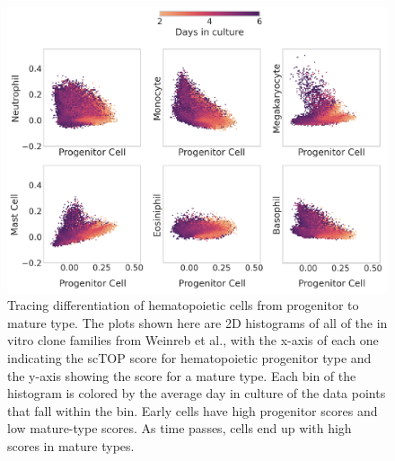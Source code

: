 \documentclass[aps,superscriptaddress, notitlepage,longbibliography]{revtex4-1}
\begin{document}
\begin{figure}
	\centering
		\includegraphics[scale=0.75]{figs/hem progenitor hists.png}
	\caption{Tracing differentiation of hematopoietic cells from progenitor to mature type. The plots shown here are 2D histograms of all of the in vitro clone families from Weinreb et al., with the x-axis of each one indicating the scTOP score for hematopoietic progenitor type and the y-axis showing the score for a mature type. Each bin of the histogram is colored by the average day in culture of the data points that fall within the bin. Early cells have high progenitor scores and low mature-type scores. As time passes, cells end up with high scores in mature types.}
	\label{hem progenitor}
\end{figure}
\end{document}
